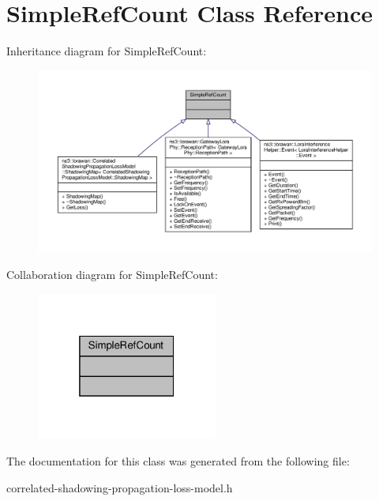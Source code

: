 \hypertarget{classSimpleRefCount}{}\section{Simple\+Ref\+Count Class Reference}
\label{classSimpleRefCount}


Inheritance diagram for Simple\+Ref\+Count\+:
\nopagebreak
\begin{figure}[H]
\begin{center}
\leavevmode
\includegraphics[width=350pt]{classSimpleRefCount__inherit__graph}
\end{center}
\end{figure}


Collaboration diagram for Simple\+Ref\+Count\+:
\nopagebreak
\begin{figure}[H]
\begin{center}
\leavevmode
\includegraphics[width=169pt]{classSimpleRefCount__coll__graph}
\end{center}
\end{figure}


The documentation for this class was generated from the following file\+:\begin{DoxyCompactItemize}
\item 
correlated-\/shadowing-\/propagation-\/loss-\/model.\+h\end{DoxyCompactItemize}
